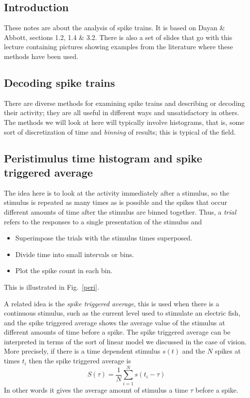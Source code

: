 \documentclass[11pt,a4paper]{scrartcl}
\begin{document}
\subsection*{Introduction}
These notes are about the analysis of spike trains. It is based on
Dayan \& Abbott, sections 1.2, 1.4 \& 3.2. There is also a set of
slides that go with this lecture containing pictures showing examples
from the literature where these methods have been used.

\subsection*{Decoding spike trains}
There are diverse methods for examining spike trains and describing or
decoding their activity; they are all useful in different ways and
unsatisfactory in others. The methods we will look at here will
typically involve histograms, that is, some sort of discretization of
time and \textsl{binning} of results; this is typical of the field.

\subsection*{Peristimulus time histogram and spike triggered average}
The idea here is to look at the activity immediately after a
stimulus, so the stimulus is repeated as many times as is possible and
the spikes that occur different amounts of time after the stimulus are
binned together. Thus, a \textsl{trial} refers to the responses to a single presentation of the stimulus and
\begin{itemize}
\item Superimpose the trials with the stimulus times superposed.
\item Divide time into small intervals or bins.
\item Plot the spike count in each bin.
\end{itemize}
This is illustrated in Fig.~\ref{peri}. 

A related idea is the \textsl{spike triggered average}, this is used
when there is a continuous stimulus, such as the current level used to
stimulate an electric fish, and the spike triggered average shows the
average value of the stimulus at different amounts of time before a
spike. The spike triggered average can be interpreted in terms of the
sort of linear model we discussed in the case of vision. More
precisely, if there is a time dependent stimulus $s(t)$ and the $N$
spikes at times $t_i$ then the spike triggered average is
\begin{equation}
S(\tau)=\frac{1}{N}\sum_{i=1}^N s(t_i-\tau)
\end{equation}
In other words it gives the average amount of stimulus a time $\tau$
before a spike.
\end{document}
